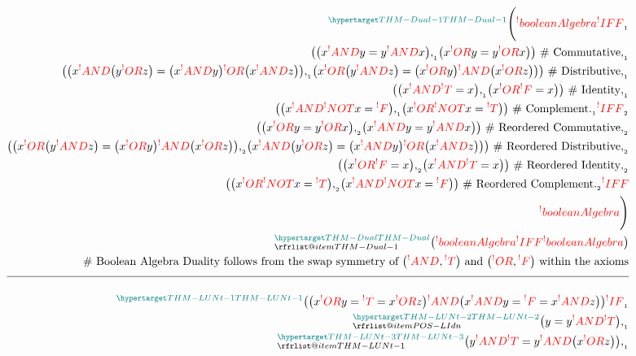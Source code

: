 \documentclass[a4paper]{article}
\makeatletter
\def\ml{\mleft}
\def\mr{\mright}
\newcommand{\eq}{=}
\newcommand{\cusand}{,}
\newcommand{\cusend}{.}
\newcommand{\cusnum}[2]{{#1}_{{\phantom{ }}_{#2}}}
\newcommand{\eqComment}[1]{\text{  \# #1}}
\newcommand{\n}{\\[1.5ex] \hline \nonumber \\[0ex]}
\newcommand{\m}{\nonumber \\}
\newcommand\rfrlist[1]{%
    \forcsvlist{\rfrlist@item}{#1}
}
\newcommand\rfrlist@item[1]{\rfr{#1}\\}
\newcommand{\thmlink}[2]{{}_{\substack{\rfrlist{#1}}}^{\dfn{#2}} }
\makeatother
\begin{document}
\begin{tcolorbox}
\begin{align}
     \thmlink{}{THM-Dual-1} \Bigg(\rfr{booleanAlgebra} [\{\rfr{T}, \rfr{F}\}, \rfr{AND}, \rfr{OR}, \rfr{NOT}][] \cusnum{\rfr{IFF}}{1}
\m \ml(\ml(x \rfr{AND} y \eq y \rfr{AND} x\mr) \cusnum{\cusand}{1} \ml(x \rfr{OR} y \eq y \rfr{OR} x\mr)\mr) \eqComment{Commutative} \cusnum{\cusand}{1}
\m \ml(\ml(x \rfr{AND} \ml(y \rfr{OR} z\mr) \eq \ml(x \rfr{AND} y\mr) \rfr{OR} \ml(x \rfr{AND} z\mr)\mr) \cusnum{\cusand}{1} \ml(x \rfr{OR} \ml(y \rfr{AND} z\mr) \eq \ml(x \rfr{OR} y\mr) \rfr{AND} \ml(x \rfr{OR} z\mr)\mr)\mr) \eqComment{Distributive} \cusnum{\cusand}{1}
\m \ml(\ml(x \rfr{AND} \rfr{T} \eq x\mr) \cusnum{\cusand}{1} \ml(x \rfr{OR} \rfr{F} \eq x\mr)\mr) \eqComment{Identity} \cusnum{\cusand}{1}
\m \ml(\ml(x \rfr{AND} \rfr{NOT} x \eq \rfr{F}\mr) \cusnum{\cusand}{1} \ml(x \rfr{OR} \rfr{NOT} x \eq \rfr{T}\mr)\mr) \eqComment{Complement} \cusnum{\cusend}{1} \cusnum{\rfr{IFF}}{2}
\m \ml(\ml(x \rfr{OR} y \eq y \rfr{OR} x\mr) \cusnum{\cusand}{2} \ml(x \rfr{AND} y \eq y \rfr{AND} x\mr)\mr) \eqComment{Reordered Commutative} \cusnum{\cusand}{2}
\m \ml(\ml(x \rfr{OR} \ml(y \rfr{AND} z\mr) \eq \ml(x \rfr{OR} y\mr) \rfr{AND} \ml(x \rfr{OR} z\mr)\mr) \cusnum{\cusand}{2} \ml(x \rfr{AND} \ml(y \rfr{OR} z\mr) \eq \ml(x \rfr{AND} y\mr) \rfr{OR} \ml(x \rfr{AND} z\mr)\mr)\mr) \eqComment{Reordered Distributive} \cusnum{\cusand}{2}
\m \ml(\ml(x \rfr{OR} \rfr{F} \eq x\mr) \cusnum{\cusand}{2} \ml(x \rfr{AND} \rfr{T} \eq x\mr)\mr) \eqComment{Reordered Identity} \cusnum{\cusand}{2}
\m \ml(\ml(x \rfr{OR} \rfr{NOT} x \eq \rfr{T}\mr) \cusnum{\cusand}{2} \ml(x \rfr{AND} \rfr{NOT} x \eq \rfr{F}\mr)\mr) \eqComment{Reordered Complement} \cusnum{\cusend}{2} \rfr{IFF}
\m \rfr{booleanAlgebra} [\{\rfr{F}, \rfr{T}\}, \rfr{OR}, \rfr{AND}, \rfr{NOT}][]\Bigg)
\m \thmlink{THM-Dual-1}{THM-Dual} \ml(\rfr{booleanAlgebra} [\{\rfr{T}, \rfr{F}\}, \rfr{AND}, \rfr{OR}, \rfr{NOT}][] \rfr{IFF} \rfr{booleanAlgebra} [\{\rfr{F}, \rfr{T}\}, \rfr{OR}, \rfr{AND}, \rfr{NOT}][]\mr)
\m \eqComment{Boolean Algebra Duality follows from the swap symmetry of $\ml(\rfr{AND}, \rfr{T}\mr)$ and $\ml(\rfr{OR}, \rfr{F}\mr)$ within the axioms}
    \n \thmlink{}{THM-LUNt-1} \ml(\ml(x \rfr{OR} y \eq \rfr{T} \eq x \rfr{OR} z\mr) \rfr{AND} \ml(x \rfr{AND} y \eq \rfr{F} \eq x \rfr{AND} z\mr)\mr) \cusnum{\rfr{IF}}{1}
\m \thmlink{POS-LIdn}{THM-LUNt-2} \ml(y \eq y \rfr{AND} \rfr{T}\mr) \cusnum{\cusand}{1}
\m \thmlink{THM-LUNt-1}{THM-LUNt-3} \ml(y \rfr{AND} \rfr{T} \eq y \rfr{AND} \ml(x \rfr{OR} z\mr)\mr) \cusnum{\cusand}{1}

\end{align}
\end{tcolorbox}
\end{document}

